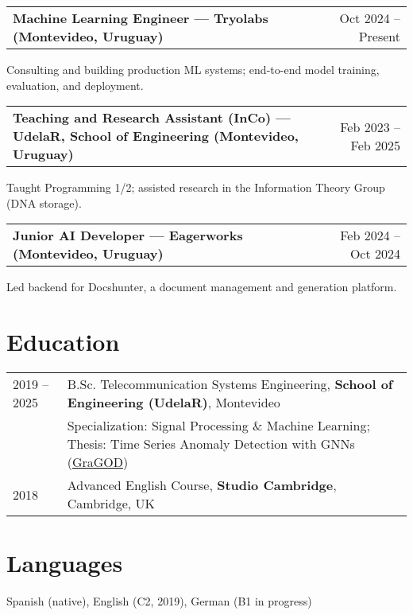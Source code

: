 \documentclass[a4paper,12pt]{article}
\makeatletter
\newenvironment{jobshort}[2]
    {
    \begin{tabularx}{\linewidth}{@{}l X r@{}}
    \textbf{#1} & \hfill &  #2 \\[3.75pt]
    \end{tabularx}
    }
    {
    }
\makeatother
\begin{document}
\begin{jobshort}{Machine Learning Engineer — Tryolabs (Montevideo, Uruguay)}{Oct 2024 -- Present}
Consulting and building production ML systems; end-to-end model training, evaluation, and deployment.
\end{jobshort}

\begin{jobshort}{Teaching and Research Assistant (InCo) — UdelaR, School of Engineering (Montevideo, Uruguay)}{Feb 2023 -- Feb 2025}
Taught Programming 1/2; assisted research in the Information Theory Group (DNA storage).
\end{jobshort}

\begin{jobshort}{Junior AI Developer — Eagerworks (Montevideo, Uruguay)}{Feb 2024 -- Oct 2024}
Led backend for Docshunter, a document management and generation platform.
\end{jobshort}

\section{Education}
\begin{tabularx}{\linewidth}{@{}l X@{}} 	
2019 -- 2025 & B.Sc. Telecommunication Systems Engineering, \textbf{School of Engineering (UdelaR)}, Montevideo \\
& Specialization: Signal Processing \& Machine Learning; Thesis: Time Series Anomaly Detection with GNNs (\href{https://github.com/GraGODs/GraGOD}{GraGOD}) \\
2018 & Advanced English Course, \textbf{Studio Cambridge}, Cambridge, UK \\
\end{tabularx}


\section{Languages}
Spanish (native), English (C2, 2019), German (B1 in progress)
\end{document}
